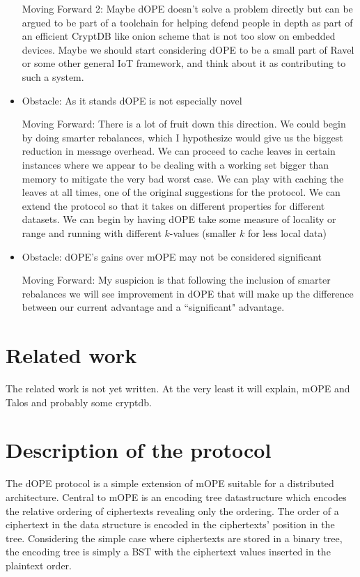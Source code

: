 \documentclass[12pt]{article}
\begin{document}
\begin{itemize}
Moving Forward 2: Maybe dOPE doesn't solve a problem directly but can be argued to be part of a toolchain for helping defend people in depth as part of an efficient CryptDB like onion scheme that is not too slow on embedded devices.  Maybe we should start considering dOPE to be a small part of Ravel or some other general IoT framework, and think about it as contributing to such a system.

\item
Obstacle: As it stands dOPE is not especially novel

Moving Forward: There is a lot of fruit down this direction.  We could begin by doing smarter rebalances, which I hypothesize would give us the biggest reduction in message overhead.  We can proceed to cache leaves in certain instances where we appear to be dealing with a working set bigger than memory to mitigate the very bad worst case.   We can play with caching the leaves at all times, one of the original suggestions for the protocol.  We can extend the protocol so that it takes on different properties for different datasets.  We can begin by having dOPE take some measure of locality or range and running with different $k$-values (smaller $k$ for less local data)

\item 
Obstacle: dOPE's gains over mOPE may not be considered significant

Moving Forward: My suspicion is that following the inclusion of smarter rebalances we will see improvement in dOPE that will make up the difference between our current advantage and a ``significant" advantage.

\end{itemize} 


\section{Related work}

The related work is not yet written.  At the very least it will explain, mOPE and Talos and probably some cryptdb.

\section{Description of the protocol}
The dOPE protocol is a simple extension of mOPE suitable for a distributed architecture.  Central to mOPE is an encoding tree datastructure which encodes the relative ordering of ciphertexts revealing only the ordering.  The order of a ciphertext in the data structure is encoded in the ciphertexts' position in the tree.  Considering the simple case where ciphertexts are stored in a binary tree, the encoding tree is simply a BST with the ciphertext values inserted in the plaintext order.
\end{document}
